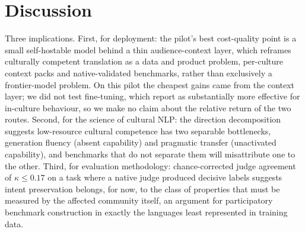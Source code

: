 \documentclass[11pt]{article}
\begin{document}
\section{Discussion}
Three implications. First, for deployment: the pilot's best cost-quality point is a small self-hostable model behind a thin audience-context layer, which reframes culturally competent translation as a data and product problem, per-culture context packs and native-validated benchmarks, rather than exclusively a frontier-model problem. On this pilot the cheapest gains came from the context layer; we did not test fine-tuning, which \citet{sadr2025taarof} report as substantially more effective for in-culture behaviour, so we make no claim about the relative return of the two routes. Second, for the science of cultural NLP: the direction decomposition suggests low-resource cultural competence has two separable bottlenecks, generation fluency (absent capability) and pragmatic transfer (unactivated capability), and benchmarks that do not separate them will misattribute one to the other. Third, for evaluation methodology: chance-corrected judge agreement of $\kappa \le 0.17$ on a task where a native judge produced decisive labels suggests intent preservation belongs, for now, to the class of properties that must be measured by the affected community itself, an argument for participatory benchmark construction in exactly the languages least represented in training data.
\end{document}
